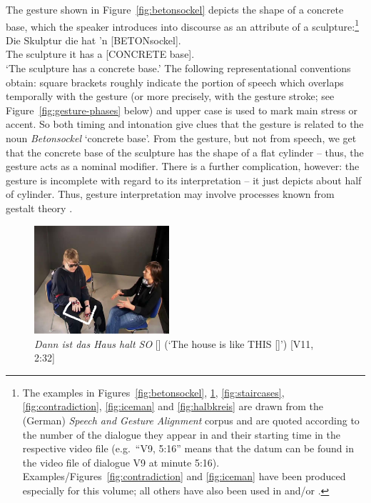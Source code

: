 \documentclass[output=paper
                ,modfonts
                ,nonflat
	        ,collection
	        ,collectionchapter
	        ,collectiontoclongg
 	        ,biblatex
                ,babelshorthands
                ,newtxmath
                ,draftmode
                ,colorlinks, citecolor=brown
]{./langsci/langscibook}
\begin{document}
The gesture shown in Figure~\ref{fig:betonsockel} depicts the shape of a concrete base, which the speaker introduces into discourse as an attribute of a sculpture:\footnote{The examples in Figures~\ref{fig:betonsockel}, \ref{fig:so}, \ref{fig:staircases}, \ref{fig:contradiction}, \ref{fig:iceman} and \ref{fig:halbkreis} are drawn from the (German) \emph{Speech and Gesture Alignment} corpus \citep[,][]{Luecking:Bergmann:Hahn:Kopp:Rieser:2010} and are quoted according to the number of the dialogue they appear in and their starting time in the respective video file (e.g.\ \enquote{V9, 5:16} means that the datum can be found in the video file of dialogue V9 at minute 5:16). Examples/Figures~\ref{fig:contradiction} and \ref{fig:iceman} have been produced especially for this volume; all others have also been used in \citet{Luecking:2013:a} and/or \citet{Luecking:2016}.}
%
\ea \label{ex:betonsockel}
\gll Die Skulptur die hat 'n [BETONsockel]. \\
     The sculpture it has a {[CONCRETE base]}. \\
\glt \enquote*{The sculpture has a concrete base.}
\z
%
The following representational conventions obtain: square brackets roughly indicate the portion of speech which overlaps temporally with the gesture (or more precisely, with the gesture stroke; see Figure~\ref{fig:gesture-phases} below) and upper case is used to mark main stress or accent.
%
So both timing and intonation give clues that the gesture is related to the noun \emph{Betonsockel} `concrete base'.
%
From the gesture, but not from speech, we get that the concrete base of the sculpture has the shape of a flat cylinder -- thus, the gesture acts as a nominal modifier.
%
There is a further complication, however: the gesture is incomplete with regard to its interpretation -- it just depicts about half of cylinder. 
%
Thus, gesture interpretation may involve processes known from gestalt theory \citetext{see \citealp{Luecking:2016} on a \emph{good continuation}  constraint relevant to (\ref{ex:betonsockel})/Figure~\ref{fig:betonsockel}}.


\begin{figure}
  \centering
  \includegraphics[trim={1cm 0 5cm 5cm}, clip, width=5cm]{figures/mmsubcat2}
  \caption[Like this]{\textit{Dann ist das Haus halt SO} [] (\enquote*{The house is like THIS []}) [V11, 2:32]}
  \label{fig:so}
\end{figure}
\end{document}

